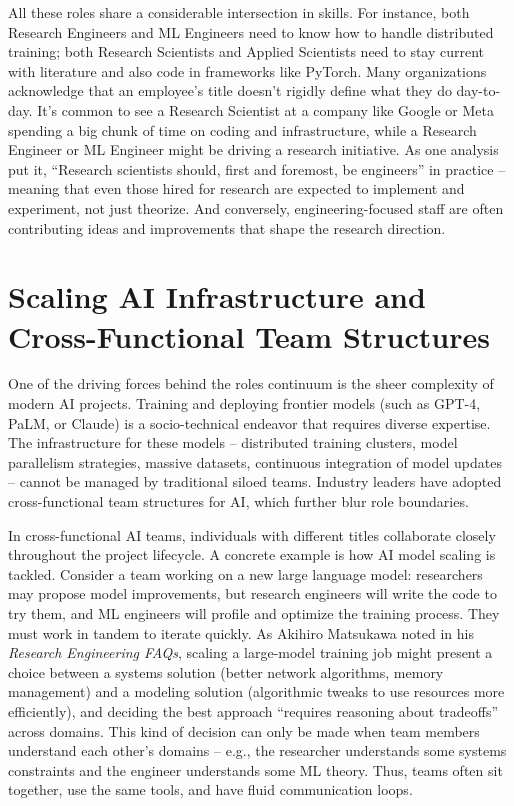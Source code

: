 \documentclass[pdflatex,sn-mathphys-num]{sn-jnl}%
\theoremstyle{thmstyleone}%
\theoremstyle{thmstyletwo}%
\theoremstyle{thmstylethree}%
\begin{document}
\noindent All these roles share a considerable intersection in skills. For instance, both Research Engineers and ML Engineers need to know how to handle distributed training; both Research Scientists and Applied Scientists need to stay current with literature and also code in frameworks like PyTorch. Many organizations acknowledge that an employee’s title doesn’t rigidly define what they do day-to-day. It’s common to see a Research Scientist at a company like Google or Meta spending a big chunk of time on coding and infrastructure, while a Research Engineer or ML Engineer might be driving a research initiative. As one analysis put it, “Research scientists should, first and foremost, be engineers” in practice\cite{Huyen2022} – meaning that even those hired for research are expected to implement and experiment, not just theorize. And conversely, engineering-focused staff are often contributing ideas and improvements that shape the research direction. 

\section{Scaling AI Infrastructure and Cross-Functional Team Structures}
One of the driving forces behind the roles continuum is the sheer complexity of modern AI projects. Training and deploying frontier models (such as GPT-4, PaLM, or Claude) is a socio-technical endeavor that requires diverse expertise. The infrastructure for these models – distributed training clusters, model parallelism strategies, massive datasets, continuous integration of model updates – cannot be managed by traditional siloed teams. Industry leaders have adopted cross-functional team structures for AI, which further blur role boundaries.

In cross-functional AI teams, individuals with different titles collaborate closely throughout the project lifecycle. A concrete example is how AI model scaling is tackled. Consider a team working on a new large language model: researchers may propose model improvements, but research engineers will write the code to try them, and ML engineers will profile and optimize the training process. They must work in tandem to iterate quickly. As Akihiro Matsukawa \cite{Matsukawa2019} noted in his \textit{Research Engineering FAQs}, scaling a large-model training job might present a choice between a systems solution (better network algorithms, memory management) and a modeling solution (algorithmic tweaks to use resources more efficiently), and deciding the best approach “requires reasoning about tradeoffs” across domains\cite{Matsukawa2019}. This kind of decision can only be made when team members understand each other’s domains – e.g., the researcher understands some systems constraints and the engineer understands some ML theory. Thus, teams often sit together, use the same tools, and have fluid communication loops.
\end{document}
